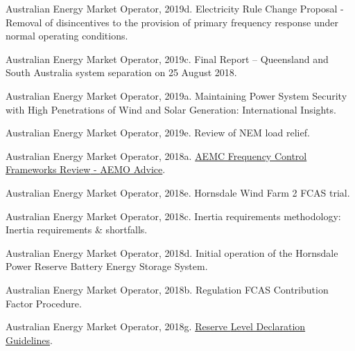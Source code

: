 \documentclass[12pt,a4paper,]{report}
\newlength{\cslhangindent}
\newenvironment{CSLReferences}[2] %
 {%
  \setlength{\parindent}{0pt}
  \ifodd #1 \everypar{\setlength{\hangindent}{\cslhangindent}}\ignorespaces\fi
  \ifnum #2 > 0
  \setlength{\parskip}{#2\baselineskip}
  \fi
 }%
 {}
\begin{document}
\begin{CSLReferences}{1}{0}
\leavevmode{}%
Australian Energy Market Operator, 2019d. Electricity {Rule Change
Proposal} - {Removal} of disincentives to the provision of primary
frequency response under normal operating conditions.

\leavevmode{}%
Australian Energy Market Operator, 2019c. Final {Report} -- {Queensland}
and {South Australia} system separation on 25 {August} 2018.

\leavevmode{}%
Australian Energy Market Operator, 2019a. Maintaining {Power System
Security} with {High Penetrations} of {Wind} and {Solar Generation}:
{International Insights}.

\leavevmode{}%
Australian Energy Market Operator, 2019e. Review of {NEM} load relief.

\leavevmode{}%
Australian Energy Market Operator, 2018a.
\href{https://www.aemc.gov.au/sites/default/files/2018-03/Advice\%20from\%20AEMO\%20-\%20Primary\%20frequency\%20control.PDF}{{AEMC
Frequency Control Frameworks Review} - {AEMO Advice}}.

\leavevmode{}%
Australian Energy Market Operator, 2018e. Hornsdale {Wind Farm} 2 {FCAS}
trial.

\leavevmode{}%
Australian Energy Market Operator, 2018c. Inertia requirements
methodology: Inertia requirements \& shortfalls.

\leavevmode{}%
Australian Energy Market Operator, 2018d. Initial operation of the
{Hornsdale Power Reserve Battery Energy Storage System}.

\leavevmode{}%
Australian Energy Market Operator, 2018b. Regulation {FCAS Contribution
Factor Procedure}.

\leavevmode{}%
Australian Energy Market Operator, 2018g.
\href{https://www.aemo.com.au/-/media/files/electricity/nem/security_and_reliability/power_system_ops/reserve-level-declaration-guidelines.pdf?la=en}{Reserve
{Level Declaration Guidelines}}.


\end{CSLReferences}
\end{document}
